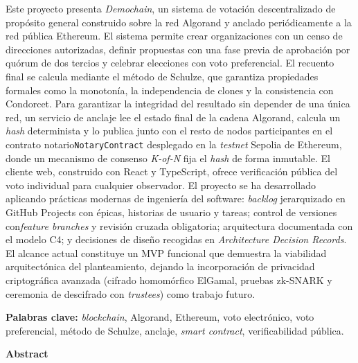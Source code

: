 Este proyecto presenta \emph{Demochain}, un sistema de votación descentralizado de propósito general construido sobre la
red Algorand y anclado periódicamente a la red pública Ethereum.
El sistema permite crear organizaciones con un censo de direcciones autorizadas, definir propuestas con una fase previa
de aprobación por quórum de dos tercios y celebrar elecciones con voto preferencial.
El recuento final se calcula mediante el método de Schulze, que garantiza propiedades formales como la monotonía, la
independencia de clones y la consistencia con Condorcet.
Para garantizar la integridad del resultado sin depender de una única red, un servicio de anclaje lee el estado final de
la cadena Algorand, calcula un \textit{hash} determinista y lo publica junto con el resto de nodos participantes en el
contrato notario\texttt{NotaryContract} desplegado en la \emph{testnet} Sepolia de Ethereum, donde un mecanismo de
consenso \textit{K-of-N} fija el \textit{hash} de forma inmutable.
El cliente web, construido con React y TypeScript, ofrece verificación pública del voto individual para cualquier
observador.
El proyecto se ha desarrollado aplicando prácticas modernas de ingeniería del software: \emph{backlog} jerarquizado en
GitHub Projects con épicas, historias de usuario y tareas; control de versiones con\emph{feature branches} y revisión
cruzada obligatoria; arquitectura documentada con el modelo C4; y decisiones de diseño recogidas en \emph{Architecture
Decision Records}.
El alcance actual constituye un \ac{MVP} funcional que demuestra la viabilidad arquitectónica del planteamiento, dejando
la incorporación de privacidad criptográfica avanzada (cifrado homomórfico ElGamal, pruebas zk-SNARK y ceremonia de
descifrado con \emph{trustees}) como trabajo futuro.

\textbf{Palabras clave:} \emph{blockchain}, Algorand, Ethereum, voto electrónico, voto preferencial, método de Schulze,
anclaje, \emph{smart contract}, verificabilidad pública.

\vspace{1cm}
\begin{center}
    \textbf{\Large Abstract}
\end{center}
\vspace{0.5cm}

